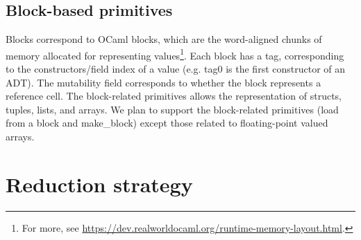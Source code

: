\documentclass[11pt,fleqn]{amsart}
\begin{document}
\subsection{Block-based primitives}
Blocks correspond to OCaml blocks, which are the word-aligned chunks of memory allocated for representing values\footnote{For more, see \url{https://dev.realworldocaml.org/runtime-memory-layout.html}. }.
Each block has a tag, corresponding to the constructors/field index of a value (e.g. \textsf{tag0} is the first constructor of an ADT).
The mutability field corresponds to whether the block represents a reference cell.
The block-related primitives allows the representation of structs, tuples, lists, and arrays.
We plan to support the block-related primitives (\textsf{load} from a block and \textsf{make\_block}) except those related to floating-point valued arrays.

\section{Reduction strategy}
\end{document}
